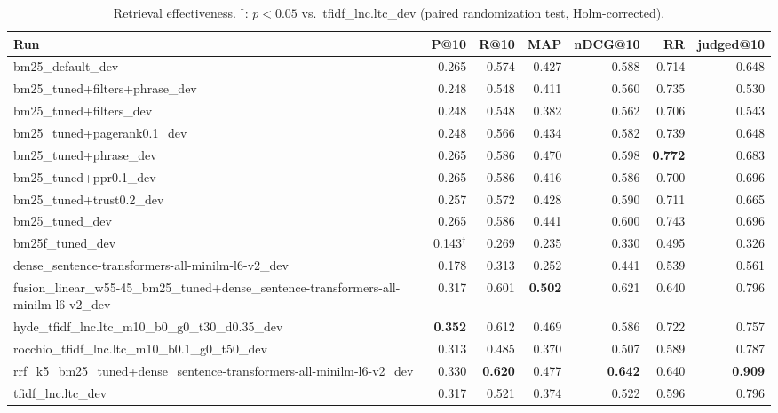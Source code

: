 \begin{table}[t]
\centering
\begin{tabular}{lrrrrrr}
\toprule
Run & P@10 & R@10 & MAP & nDCG@10 & RR & judged@10 \\
\midrule
bm25\_default\_dev & 0.265 & 0.574 & 0.427 & 0.588 & 0.714 & 0.648 \\
bm25\_tuned+filters+phrase\_dev & 0.248 & 0.548 & 0.411 & 0.560 & 0.735 & 0.530 \\
bm25\_tuned+filters\_dev & 0.248 & 0.548 & 0.382 & 0.562 & 0.706 & 0.543 \\
bm25\_tuned+pagerank0.1\_dev & 0.248 & 0.566 & 0.434 & 0.582 & 0.739 & 0.648 \\
bm25\_tuned+phrase\_dev & 0.265 & 0.586 & 0.470 & 0.598 & \textbf{0.772} & 0.683 \\
bm25\_tuned+ppr0.1\_dev & 0.265 & 0.586 & 0.416 & 0.586 & 0.700 & 0.696 \\
bm25\_tuned+trust0.2\_dev & 0.257 & 0.572 & 0.428 & 0.590 & 0.711 & 0.665 \\
bm25\_tuned\_dev & 0.265 & 0.586 & 0.441 & 0.600 & 0.743 & 0.696 \\
bm25f\_tuned\_dev & 0.143$^\dagger$ & 0.269 & 0.235 & 0.330 & 0.495 & 0.326 \\
dense\_sentence-transformers-all-minilm-l6-v2\_dev & 0.178 & 0.313 & 0.252 & 0.441 & 0.539 & 0.561 \\
fusion\_linear\_w55-45\_bm25\_tuned+dense\_sentence-transformers-all-minilm-l6-v2\_dev & 0.317 & 0.601 & \textbf{0.502} & 0.621 & 0.640 & 0.796 \\
hyde\_tfidf\_lnc.ltc\_m10\_b0\_g0\_t30\_d0.35\_dev & \textbf{0.352} & 0.612 & 0.469 & 0.586 & 0.722 & 0.757 \\
rocchio\_tfidf\_lnc.ltc\_m10\_b0.1\_g0\_t50\_dev & 0.313 & 0.485 & 0.370 & 0.507 & 0.589 & 0.787 \\
rrf\_k5\_bm25\_tuned+dense\_sentence-transformers-all-minilm-l6-v2\_dev & 0.330 & \textbf{0.620} & 0.477 & \textbf{0.642} & 0.640 & \textbf{0.909} \\
tfidf\_lnc.ltc\_dev & 0.317 & 0.521 & 0.374 & 0.522 & 0.596 & 0.796 \\
\bottomrule
\end{tabular}
\caption{Retrieval effectiveness. $^\dagger$: $p<0.05$ vs.\ tfidf\_lnc.ltc\_dev (paired randomization test, Holm-corrected).}
\end{table}
